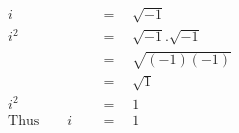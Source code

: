 \begin{align*}
i\quad&\,=\quad\sqrt{-1}\\
i^2\quad&\,=\quad \sqrt{-1}.\sqrt{-1}\\
\,&\,=\quad\sqrt{(-1)(-1)}\\
\,&\,=\quad\sqrt{1}\\
i^2\quad&\,=\quad1\\
\mathrm{Thus}\qquad i\quad&\,=\quad1
\end{align*}
